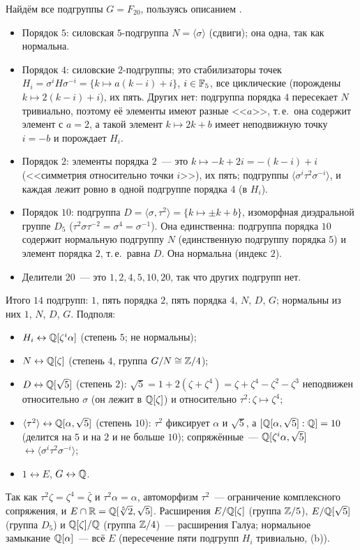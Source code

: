\begin{example}
Найдём все подгруппы $G=F_{20}$, пользуясь описанием .
\begin{itemize}[leftmargin=*]
\item Порядок $5$: силовская $5$-подгруппа $N=\langle\sigma\rangle$ (сдвиги); она одна, так как нормальна.
\item Порядок $4$: силовские $2$-подгруппы; это стабилизаторы точек $H_i=\sigma^iH\sigma^{-i}=\{k\mapsto a(k-i)+i\}$, $i\in\mathbb F_5$, все
циклические (порождены $k\mapsto2(k-i)+i$), их пять. Других нет: подгруппа порядка $4$ пересекает $N$ тривиально, поэтому её
элементы имеют разные <<$a$>>, т.\,е.\ она содержит элемент с $a=2$, а такой элемент $k\mapsto2k+b$ имеет неподвижную точку
$i=-b$ и порождает $H_i$.
\item Порядок $2$: элементы порядка $2$~--- это $k\mapsto-k+2i=-(k-i)+i$ (<<симметрия относительно точки $i$>>), их пять;
подгруппы $\langle\sigma^i\tau^2\sigma^{-i}\rangle$, и каждая лежит ровно в одной подгруппе порядка $4$ (в $H_i$).
\item Порядок $10$: подгруппа $D=\langle\sigma,\tau^2\rangle=\{k\mapsto\pm k+b\}$, изоморфная диэдральной группе $D_5$
($\tau^2\sigma\tau^{-2}=\sigma^4=\sigma^{-1}$). Она единственна: подгруппа порядка $10$ содержит нормальную подгруппу $N$ (единственную
подгруппу порядка $5$) и элемент порядка $2$, т.\,е.\ равна $D$. Она нормальна (индекс $2$).
\item Делители $20$~--- это $1,2,4,5,10,20$, так что других подгрупп нет.
\end{itemize}
Итого $14$ подгрупп: $1$, пять порядка $2$, пять порядка $4$, $N$, $D$, $G$; нормальны из них $1$, $N$, $D$, $G$. Подполя:
\begin{itemize}[leftmargin=*]
\item $H_i\leftrightarrow\mathbb Q[\zeta^i\alpha]$ (степень $5$; не нормальны);
\item $N\leftrightarrow\mathbb Q[\zeta]$ (степень $4$, группа $G/N\cong\mathbb Z/4$);
\item $D\leftrightarrow\mathbb Q[\sqrt5]$ (степень $2$): $\sqrt5=1+2(\zeta+\zeta^4)=\zeta+\zeta^4-\zeta^2-\zeta^3$ неподвижен относительно
$\sigma$ (он лежит в $\mathbb Q[\zeta]$) и относительно $\tau^2\colon\zeta\mapsto\zeta^4$;
\item $\langle\tau^2\rangle\leftrightarrow\mathbb Q[\alpha,\sqrt5]$ (степень $10$): $\tau^2$ фиксирует $\alpha$ и $\sqrt5$, а
$[\mathbb Q[\alpha,\sqrt5]:\mathbb Q]=10$ (делится на $5$ и на $2$ и не больше $10$); сопряжённые~--- $\mathbb Q[\zeta^i\alpha,\sqrt5]$
$\leftrightarrow\langle\sigma^i\tau^2\sigma^{-i}\rangle$;
\item $1\leftrightarrow E$, $G\leftrightarrow\mathbb Q$.
\end{itemize}
Так как $\tau^2\zeta=\zeta^4=\bar\zeta$ и $\tau^2\alpha=\alpha$, автоморфизм $\tau^2$~--- ограничение комплексного сопряжения, и
$E\cap\mathbb R=\mathbb Q[\sqrt[5]2,\sqrt5]$. Расширения $E/\mathbb Q[\zeta]$ (группа $\mathbb Z/5$), $E/\mathbb Q[\sqrt5]$ (группа $D_5$) и $\mathbb Q[\zeta]/\mathbb Q$ (группа
$\mathbb Z/4$)~--- расширения Галуа; нормальное замыкание $\mathbb Q[\alpha]$~--- всё $E$ (пересечение пяти подгрупп $H_i$ тривиально,
(b)).
\end{example}

